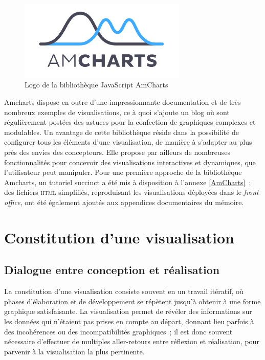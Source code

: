 \documentclass[a4paper,12pt,twoside]{book}
\newcommand{\eng}{\emph}
\newcommand{\html}{\textsc{html}\xspace}
\newcommand{\fo}{\eng{front office}\xspace}
\begin{document}
\begin{figure}[h!]
	\centering
	\includegraphics[width=8cm]{Images/AmCharts.png}
	\caption{Logo de la bibliothèque JavaScript AmCharts}
\end{figure}

Amcharts dispose en outre d'une impressionnante documentation et de très nombreux exemples de visualisations, ce à quoi s'ajoute un blog où sont régulièrement postées des astuces pour la confection de graphiques complexes et modulables. Un avantage de cette bibliothèque réside dans la possibilité de configurer tous les éléments d'une visualisation, de manière à s'adapter au plus près des envies des concepteurs. Elle propose par ailleurs de nombreuses fonctionnalités pour concevoir des visualisations interactives et dynamiques, que l'utilisateur peut manipuler. Pour une première approche de la bibliothèque Amcharts, un tutoriel succinct a été mis à disposition à l'annexe \ref{AmCharts}~; des fichiers \html simplifiés, reproduisant les visualisations déployées dans le \fo, ont été également ajoutés aux appendices documentaires du mémoire.

	\section{Constitution d'une visualisation}
		\subsection{Dialogue entre conception et réalisation}
La constitution d'une visualisation consiste souvent en un travail itératif, où phases d'élaboration et de développement se répètent jusqu'à obtenir à une forme graphique satisfaisante. La visualisation permet de révéler des informations sur les données qui n'étaient pas prises en compte au départ, donnant lieu parfois à des incohérences ou des incompatibilités graphiques~; il est donc souvent nécessaire d'effectuer de multiples aller-retours entre réflexion et réalisation, pour parvenir à la visualisation la plus pertinente.
\end{document}
